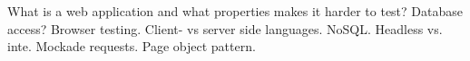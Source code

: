 \label{sec:testing_web}

What is a web application and what properties makes it harder to test?
Database access? Browser testing. Client- vs server side languages.
NoSQL. Headless vs. inte. Mockade requests. Page object pattern.

